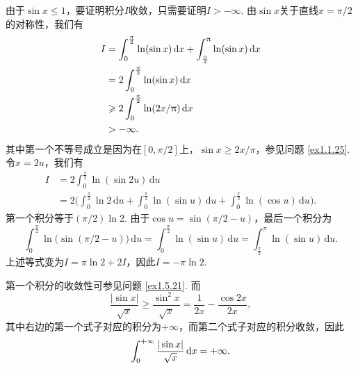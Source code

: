 \begin{ans}
  由于$\sin x\le1$，要证明积分$I$收敛，只需要证明$I>-\infty$. 由$\sin x$关于直线$x=\pi/2$的对称性，我们有
  \begin{align*}
    I & = \int_0^{\frac{\uppi}2}\ln(\sin x)\,\mathrm dx
          + \int_{\frac{\uppi}2}^\uppi\ln(\sin x)\,\mathrm dx\\
      & = 2 \int_0^{\frac{\uppi}2} \ln(\sin x)\,\mathrm dx\\
      & \geqslant 2 \int_0^{\frac{\uppi}2}\ln(2x/\uppi)\,\mathrm dx\\
      & > -\infty.
  \end{align*}
  其中第一个不等号成立是因为在$[0,\pi/2]$上，$\sin x\ge2x/\pi$，参见问题 \ref{ex1.1.25}. 令$x=2u$，我们有
  \begin{align*}
    I & = 2\int_0^{\frac\pi2}\ln(\sin 2u)\,\mathrm du\\
      & = 2\bigg( \int_0^{\frac\pi2}\ln 2\,\mathrm du
       + \int_0^{\frac\pi2}\ln(\sin u)\,\mathrm du
       + \int_0^{\frac\pi2}\ln(\cos u)\,\mathrm du \bigg).
  \end{align*}
  第一个积分等于$(\pi/2)\ln2$. 由于$\cos u=\sin(\pi/2-u)$，最后一个积分为
  \[
    \int_0^{\frac\pi2}\ln\big( \sin(\pi/2-u) \big)\,\mathrm du = \int_0^{\frac\pi2}\ln(\sin u)\,\mathrm du
    = \int_{\frac\pi2}^\pi\ln(\sin u)\,\mathrm du.
  \]
  上述等式变为$I=\pi\ln2+2I$，因此$I=-\pi\ln2$.
\end{ans}

\begin{ans}
  第一个积分的收敛性可参见问题 \ref{ex1.5.21}. 而
  \[
    \frac{|\sin x|}{\sqrt x} \ge \frac{\sin^2x}
    {\sqrt x}=\frac{1}{2x} - \frac{\cos 2x}{2x},
  \]
  其中右边的第一个式子对应的积分为$+\infty$，而第二个式子对应的积分收敛，因此
  \[\int_0^{+\infty}\frac{|\sin x|}{\sqrt x}\,\mathrm dx
  =+\infty.\]
\end{ans}

